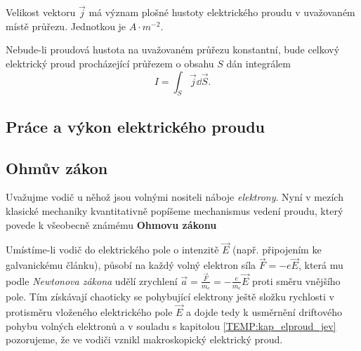       Velikost vektoru $\vec{j}$ má význam plošné hustoty elektrického proudu v uvažovaném místě
      průřezu. Jednotkou je $A\cdot m^{-2}$.
      
      Nebude-li proudová hustota na uvažovaném průřezu konstantní, bude celkový elektrický proud
      procházející průřezem o obsahu $S$ dán integrálem 
        \begin{equation}\label{TEMP:eq_I_10}
          I = \int_S \vec{j}\dd{\vec{S}}. 
        \end{equation} 

        

        

    \subsection{Práce a výkon elektrického proudu}
        
 
    \subsection{Ohmův zákon}
      Uvažujme vodič u něhož jsou volnými nositeli náboje \emph{elektrony}. Nyní v mezích klasické
      mechaniky kvantitativně popíšeme mechanismus vedení proudu, který povede k všeobecně známému
      \textbf{Ohmovu zákonu}
      
      Umístíme-li vodič do elektrického pole o intenzitě $\vec{E}$ (např. připojením ke
      galvanickému článku), působí na každý volný elektron síla $\vec{F} = -e\vec{E}$, která mu
      podle \emph{Newtonova zákona} udělí zrychlení $\vec{a} = \frac{\vec{F}}{m_e} = -
      \frac{e}{m_e}\vec{E}$ proti směru vnějšího pole. Tím získávají chaoticky se pohybující
      elektrony ještě složku rychlosti v protisměru vloženého elektrického pole $\vec{E}$ a  dojde
      tedy k usměrnění driftového pohybu volných elektronů a v souladu s kapitolou
      \ref{TEMP:kap_elproud_jev} pozorujeme, že ve vodiči vznikl makroskopický elektrický proud.
      
